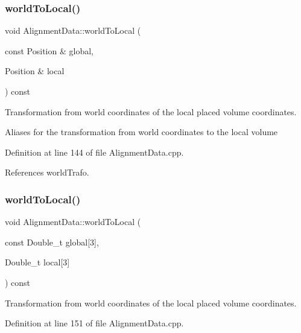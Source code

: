 \subsubsection{\texorpdfstring{world\+To\+Local()}{worldToLocal()}\hspace{0.1cm}{\footnotesize\ttfamily [1/4]}}
{\footnotesize\ttfamily void Alignment\+Data\+::world\+To\+Local (\begin{DoxyParamCaption}\item[{const Position \&}]{global,  }\item[{Position \&}]{local }\end{DoxyParamCaption}) const}



Transformation from world coordinates of the local placed volume coordinates. 

Aliases for the transformation from world coordinates to the local volume 

Definition at line 144 of file Alignment\+Data.\+cpp.



References world\+Trafo.

\hypertarget{class_d_d4hep_1_1_alignments_1_1_alignment_data_acfd97cb0ade9c1c6cc2a30784686e7ff}{}\label{class_d_d4hep_1_1_alignments_1_1_alignment_data_acfd97cb0ade9c1c6cc2a30784686e7ff} 
\subsubsection{\texorpdfstring{world\+To\+Local()}{worldToLocal()}\hspace{0.1cm}{\footnotesize\ttfamily [2/4]}}
{\footnotesize\ttfamily void Alignment\+Data\+::world\+To\+Local (\begin{DoxyParamCaption}\item[{const Double\+\_\+t}]{global\mbox{[}3\mbox{]},  }\item[{Double\+\_\+t}]{local\mbox{[}3\mbox{]} }\end{DoxyParamCaption}) const}



Transformation from world coordinates of the local placed volume coordinates. 



Definition at line 151 of file Alignment\+Data.\+cpp.



